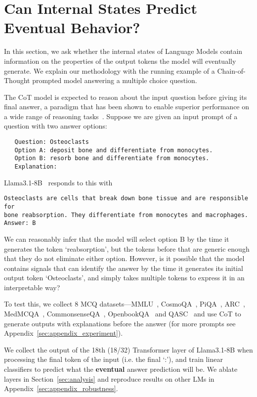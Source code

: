 \section{Can Internal States Predict Eventual Behavior?}

In this section, we ask whether the internal states of Language Models contain information on the properties of the output tokens the model will eventually generate. We explain our methodology with the running example of a Chain-of-Thought prompted model answering a multiple choice question. 

The CoT model is expected to reason about the input question before giving its final answer, a paradigm that has been shown to enable superior performance on a wide range of reasoning tasks~\citep{wei2022chain, kojima2022large, wangself}. 
Suppose we are given an input prompt of a question with two answer options:
\begin{verbatim}
   Question: Osteoclasts
   Option A: deposit bone and differentiate from monocytes.
   Option B: resorb bone and differentiate from monocytes.
   Explanation: 
\end{verbatim}

Llama3.1-8B~\citep{dubey2024llama} responds to this with
\begin{verbatim}
Osteoclasts are cells that break down bone tissue and are responsible for 
bone reabsorption. They differentiate from monocytes and macrophages. 
Answer: B
\end{verbatim}

We can reasonably infer that the model will select option B by the time it generates the token `reabsorption', but the tokens before that are generic enough that they do not eliminate either option. 
However, is it possible that the model contains signals that can identify the answer by the time it generates its initial output token `Osteoclasts', and simply takes multiple tokens to express it in an interpretable way?  

To test this, we collect 8 MCQ datasets---MMLU~\citep{hendrycksmeasuring}, CosmoQA~\citep{huang-etal-2019-cosmos}, PiQA~\citep{Bisk2020}, ARC~\citep{allenai:arc}, MedMCQA~\citep{pmlr-v174-pal22a}, CommonsenseQA~\citep{talmor-etal-2019-commonsenseqa}, OpenbookQA~\citep{mihaylov2018can} and QASC~\citep{allenai:qasc} and use CoT to generate outputs with explanations before the answer (for more prompts see Appendix~\ref{sec:appendix_experiment}).  

We collect the output of the 18th (18/32) Transformer layer of Llama3.1-8B when processing the final token of the input (i.e. the final `:'), and train linear classifiers to predict what the \textbf{eventual} answer prediction will be. We ablate layers in Section~\ref{sec:analysis} and reproduce results on other LMs in Appendix~\ref{sec:appendix_robustness}. 

